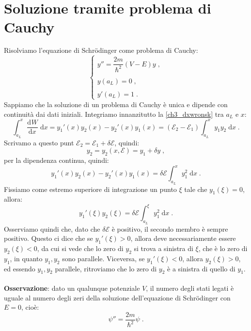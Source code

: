 \documentclass[10pt,a4paper]{report}
\theoremstyle{definition}
\newcommand{\dev}[3][]{\frac{\mathrm{d}^{#1} #2}{\mathrm{d} #3^{#1}}}
\numberwithin{equation}{section}
\newcommand{\diff}[1][]{\mathrm{d}#1}
\begin{document}
\section{Soluzione tramite problema di Cauchy}
Risolviamo l'equazione di Schrödinger come problema di Cauchy:
\begin{equation}
\begin{cases}
y''=\dfrac{2m}{\hbar^2}(V-E)y\;, \\
\\
y(a_L)=0\;, \\
\\
y'(a_L)=1\;.
\end{cases}
\end{equation}
Sappiamo che la soluzione di un problema di Cauchy è unica e dipende con continuità dai dati iniziali. Integriamo innanzitutto la \eqref{ch3_dxwronsk} tra $a_L$ e $x$:
$$
\int_{a_L}^x \dev{W}{x}\;\diff{x}=
y_1'(x)y_2(x)-y_2'(x)y_1(x)=(\mathcal{E}_2-\mathcal{E}_1)\int_{a_L}^x y_1y_2\;\diff{x}\;.
$$
Scrivamo a questo punt $\mathcal{E}_2=\mathcal{E}_1+\delta\mathcal{E}$, quindi:
$$
y_2=y_2(x,\mathcal{E})=y_1+\delta y\;,
$$
per la dipendenza continua, quindi:
$$
y_1'(x)y_2(x)-y_2'(x)y_1(x)=\delta\mathcal{E}\int_{a_L}^x y_1^2\;\diff{x}\;.
$$
Fissiamo come estremo superiore di integrazione un punto $\xi$ tale che $y_1(\xi)=0$, allora:
\begin{equation}
y_1'(\xi)y_2(\xi)=\delta\mathcal{E}\int_{a_L}^{\xi}y_1^2\;\diff{x}\;.
\end{equation}
Osserviamo quindi che, dato che $\delta\mathcal{E}$ è positivo, il secondo membro è sempre positivo. Questo ci dice che se $y_1'(\xi)>0$, allora deve necessariamente essere $y_2(\xi)<0$, da cui si vede che lo zero di $y_2$ si trova a sinistra di $\xi$, che è lo zero di $y_1$, in quanto $y_1,y_2$ sono parallele. Viceversa, se $y_1'(\xi)<0$, allora $y_2(\xi)>0$, ed essendo $y_1,y_2$ parallele, ritroviamo che lo zero di $y_2$ è a sinistra di quello di $y_1$. \\
\\
\textbf{Osservazione}: dato un qualunque potenziale $V$, il numero degli stati legati è uguale al numero degli zeri della soluzione dell'equazione di Schrödinger con $E=0$, cioè:
\begin{equation}
\psi''=\frac{2m}{\hbar^2}\psi\;.
\end{equation}
\end{document}
